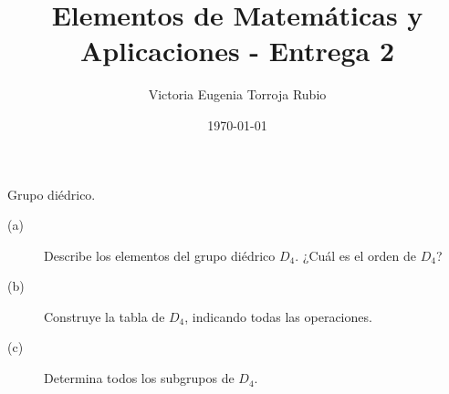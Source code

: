 \documentclass{article}
\begin{document}
\title{Elementos de Matemáticas y Aplicaciones - Entrega 2}
\author{Victoria Eugenia Torroja Rubio}
\date{\today}

\maketitle

\begin{ej}
Grupo diédrico.
\begin{description}
\item[(a)] Describe los elementos del grupo diédrico $\displaystyle D_{4} $. ¿Cuál es el orden de $\displaystyle D_{4} $?
\item[(b)] Construye la tabla de $\displaystyle D_{4} $, indicando todas las operaciones.
\item[(c)] Determina todos los subgrupos de $\displaystyle D_{4} $.
\end{description}
\end{ej}
\end{document}
